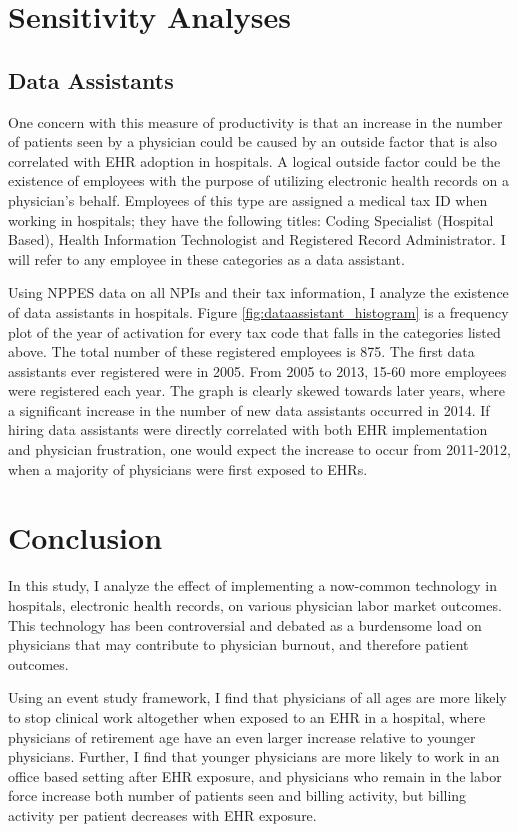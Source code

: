 \documentclass[11pt]{article}
\begin{document}
\section{Sensitivity Analyses}

\subsection{Data Assistants}

One concern with this measure of productivity is that an increase in the number of patients seen by a physician could be caused by an outside factor that is also correlated with EHR adoption in hospitals. A logical outside factor could be the existence of employees with the purpose of utilizing electronic health records on a physician's behalf. Employees of this type are assigned a medical tax ID when working in hospitals; they have the following titles: Coding Specialist (Hospital Based), Health Information Technologist and Registered Record Administrator. I will refer to any employee in these categories as a data assistant. 

Using NPPES data on all NPIs and their tax information, I analyze the existence of data assistants in hospitals. Figure \ref{fig:dataassistant_histogram} is a frequency plot of the year of activation for every tax code that falls in the categories listed above. The total number of these registered employees is 875. The first data assistants ever registered were in 2005. From 2005 to 2013, 15-60 more employees were registered each year. The graph is clearly skewed towards later years, where a significant increase in the number of new data assistants occurred in 2014. If hiring data assistants were directly correlated with both EHR implementation and physician frustration, one would expect the increase to occur from 2011-2012, when a majority of physicians were first exposed to EHRs. 


\section{Conclusion}

In this study, I analyze the effect of implementing a now-common technology in hospitals, electronic health records, on various physician labor market outcomes. This technology has been controversial and debated as a burdensome load on physicians that may contribute to physician burnout, and therefore patient outcomes. 

Using an event study framework, I find that physicians of all ages are more likely to stop clinical work altogether when exposed to an EHR in a hospital, where physicians of retirement age have an even larger increase relative to younger physicians. Further, I find that younger physicians are more likely to work in an office based setting after EHR exposure, and physicians who remain in the labor force increase both number of patients seen and billing activity, but billing activity per patient decreases with EHR exposure. 
\end{document}
